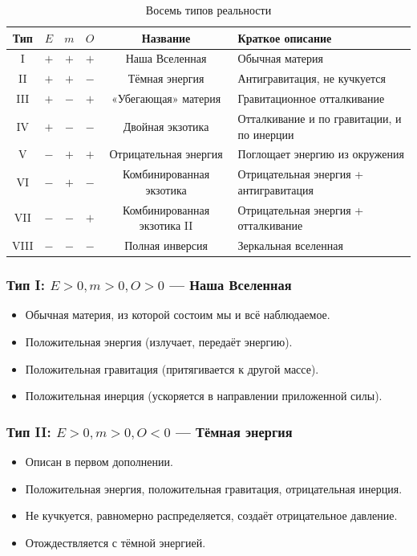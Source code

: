 \documentclass[12pt,a4paper]{article}
\begin{document}
\begin{table}[h]
    \centering
    \caption{Восемь типов реальности}
    \begin{tabular}{cccccl}
        \toprule
        Тип & $E$ & $m$ & $O$ & Название & Краткое описание \\
        \midrule
        I   & $+$ & $+$ & $+$ & Наша Вселенная & Обычная материя \\
        II  & $+$ & $+$ & $-$ & Тёмная энергия & Антигравитация, не кучкуется \\
        III & $+$ & $-$ & $+$ & «Убегающая» материя & Гравитационное отталкивание \\
        IV  & $+$ & $-$ & $-$ & Двойная экзотика & Отталкивание и по гравитации, и по инерции \\
        V   & $-$ & $+$ & $+$ & Отрицательная энергия & Поглощает энергию из окружения \\
        VI  & $-$ & $+$ & $-$ & Комбинированная экзотика & Отрицательная энергия + антигравитация \\
        VII & $-$ & $-$ & $+$ & Комбинированная экзотика II & Отрицательная энергия + отталкивание \\
        VIII& $-$ & $-$ & $-$ & Полная инверсия & Зеркальная вселенная \\
        \bottomrule
    \end{tabular}
    \label{tab:types2}
\end{table}

\subsubsection{Тип I: $E > 0, m > 0, O > 0$ --- Наша Вселенная}
\begin{itemize}
    \item Обычная материя, из которой состоим мы и всё наблюдаемое.
    \item Положительная энергия (излучает, передаёт энергию).
    \item Положительная гравитация (притягивается к другой массе).
    \item Положительная инерция (ускоряется в направлении приложенной силы).
\end{itemize}

\subsubsection{Тип II: $E > 0, m > 0, O < 0$ --- Тёмная энергия}
\begin{itemize}
    \item Описан в первом дополнении.
    \item Положительная энергия, положительная гравитация, отрицательная инерция.
    \item Не кучкуется, равномерно распределяется, создаёт отрицательное давление.
    \item Отождествляется с тёмной энергией.
\end{itemize}
\end{document}
